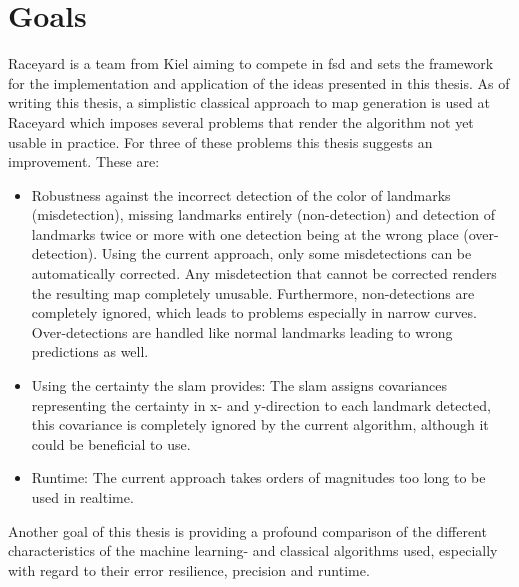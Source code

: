 


\section{Goals}
Raceyard is a team from Kiel aiming to compete in \ac{fsd} and sets the framework for the implementation and application of the ideas presented in this thesis. As of writing this thesis, a simplistic classical approach to map generation is used at Raceyard which imposes several problems that render the algorithm not yet usable in practice. For three of these problems this thesis suggests an improvement. These are:

\begin{itemize}
    \item Robustness against the incorrect detection of the color of landmarks (misdetection), missing landmarks entirely (non-detection) and detection of landmarks twice or more with one detection being at the wrong place (over-detection). Using the current approach, only some misdetections can be automatically corrected. Any misdetection that cannot be corrected renders the resulting map completely unusable. Furthermore, non-detections are completely ignored, which leads to problems especially in narrow curves. Over-detections are handled like normal landmarks leading to wrong predictions as well.
    \item Using the certainty the \ac{slam} provides: The \ac{slam} assigns covariances representing the certainty in x- and y-direction to each landmark detected, this covariance is completely ignored by the current algorithm, although it could be beneficial to use.
    \item Runtime: The current approach takes orders of magnitudes too long to be used in realtime.
\end{itemize}

Another goal of this thesis is providing a profound comparison of the different characteristics of the machine learning- and classical algorithms used, especially with regard to their error resilience, precision and runtime.

